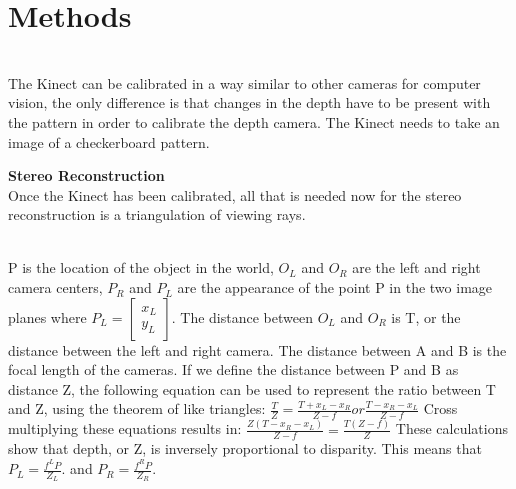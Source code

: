 \documentclass[12pt,twocolumn]{article}
\begin{document}
\section{Methods}
\\
The Kinect can be calibrated in a way similar to other cameras for computer vision, the only difference is that changes in the depth have to be present  with the pattern in order to calibrate the depth camera. The Kinect needs to take an image of a checkerboard pattern.

{ \bf Stereo Reconstruction}\\ 
Once the Kinect has been calibrated, all that is needed now for the stereo reconstruction is a triangulation of viewing rays. \\
 \\
\indent P is the location of the object in the world, $O_{L}$ and $O_{R}$ are the left and right camera centers, $P_{R}$ and $P_{L}$ are the appearance of the point P in the two image planes where $P_{L}= \begin{bmatrix}
x_{L} \\
y_{L} \end{bmatrix} $. The distance between $O_{L}$ and $O_{R}$ is T, or the distance between the left and right camera. The distance between A and B is the focal length of the cameras. If we define the distance between P and B as distance Z, the following equation  can be used to represent the ratio between T and Z, using the theorem of like triangles: 
$\frac{T}{Z}=\frac{T+x_{L}-x_{R}}{Z-f} or \frac{T-{x_{R}-x_{L}}}{Z-f} $ 
Cross multiplying these equations results in: 
$\frac{Z(T-x_{R}-x_{L})}{Z-f} = \frac{T(Z-f)}{Z} $ 
These calculations show that depth, or Z, is inversely proportional to disparity. This means that  $P_{L}= \frac{f^{L}P}{Z_{L}}. $ and $P_{R}= \frac{f^{R}P}{Z_{R}}. $ \\ 
\end{document}
